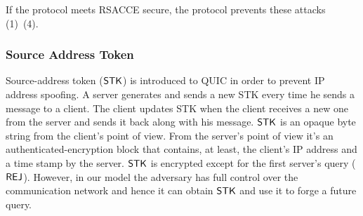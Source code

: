 If the protocol meets RSACCE secure, the protocol prevents these attacks (1)~(4).

\subsubsection{Source Address Token} \label{sec:source_address_token}
Source-address token ($\mathsf{STK}$) is introduced to QUIC in order to
prevent IP address spoofing.
A server generates and sends a new STK every time he sends a
message to a client.
The client updates STK when the client receives a new one from
the server and sends it back along with his message.
$\mathsf{STK}$ is an opaque byte string from the client's point of view.
From the server's point of view it's an authenticated-encryption
block that contains, at least, the client's IP address and a time
stamp by the server.
$\mathsf{STK}$ is encrypted except for the first server's query ($\mathsf{REJ}$).
However, in our model the adversary has full control over the
communication network and hence it can obtain $\mathsf{STK}$ and use it to
forge a future query.